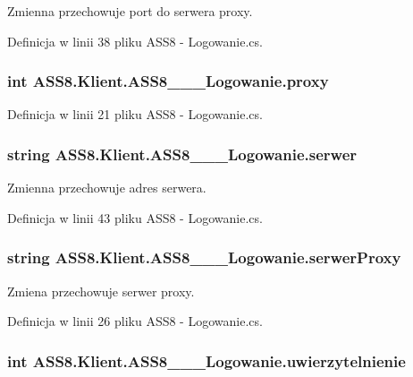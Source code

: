 Zmienna przechowuje port do serwera proxy. 



Definicja w linii 38 pliku ASS8 - Logowanie.cs.\hypertarget{a00001_2be9fdb760f0ef82c0bfd65a6867c1fb}{
\subsubsection[{proxy}]{\setlength{\rightskip}{0pt plus 5cm}int {\bf ASS8.Klient.ASS8\_\-\_\-\_\-Logowanie.proxy}}}
\label{d8/d84/a00001_2be9fdb760f0ef82c0bfd65a6867c1fb}




Definicja w linii 21 pliku ASS8 - Logowanie.cs.\hypertarget{a00001_acbba17189469119f7fdc4b0581604f3}{
\subsubsection[{serwer}]{\setlength{\rightskip}{0pt plus 5cm}string {\bf ASS8.Klient.ASS8\_\-\_\-\_\-Logowanie.serwer}}}
\label{d8/d84/a00001_acbba17189469119f7fdc4b0581604f3}


Zmienna przechowuje adres serwera. 



Definicja w linii 43 pliku ASS8 - Logowanie.cs.\hypertarget{a00001_6d2d31466c2f07ac86fd48ec831f9bb1}{
\subsubsection[{serwerProxy}]{\setlength{\rightskip}{0pt plus 5cm}string {\bf ASS8.Klient.ASS8\_\-\_\-\_\-Logowanie.serwerProxy}}}
\label{d8/d84/a00001_6d2d31466c2f07ac86fd48ec831f9bb1}


Zmiena przechowuje serwer proxy. 



Definicja w linii 26 pliku ASS8 - Logowanie.cs.\hypertarget{a00001_4b253df312924aa3a59d44df86116f92}{
\subsubsection[{uwierzytelnienie}]{\setlength{\rightskip}{0pt plus 5cm}int {\bf ASS8.Klient.ASS8\_\-\_\-\_\-Logowanie.uwierzytelnienie}}}
\label{d8/d84/a00001_4b253df312924aa3a59d44df86116f92}




